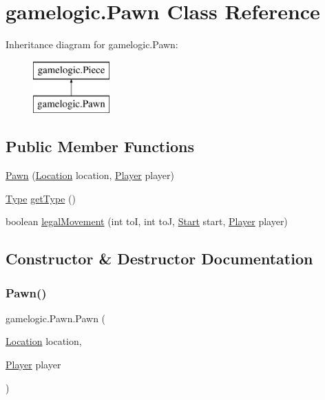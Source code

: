 \hypertarget{classgamelogic_1_1_pawn}{}\section{gamelogic.\+Pawn Class Reference}
\label{classgamelogic_1_1_pawn}
Inheritance diagram for gamelogic.\+Pawn\+:\begin{figure}[H]
\begin{center}
\leavevmode
\includegraphics[height=2.000000cm]{classgamelogic_1_1_pawn}
\end{center}
\end{figure}
\subsection*{Public Member Functions}
\begin{DoxyCompactItemize}
\item 
\mbox{\hyperlink{classgamelogic_1_1_pawn_a6ca804bf25a83fe84b36eff001737238}{Pawn}} (\mbox{\hyperlink{classgamelogic_1_1_location}{Location}} location, \mbox{\hyperlink{classgamelogic_1_1_player}{Player}} player)
\item 
\mbox{\hyperlink{enumgamelogic_1_1_type}{Type}} \mbox{\hyperlink{classgamelogic_1_1_pawn_aacb3217a868c5d3dbd98f4f96b6a7c5e}{get\+Type}} ()
\item 
boolean \mbox{\hyperlink{classgamelogic_1_1_pawn_abb8252d13a8a01c9412722543051cf37}{legal\+Movement}} (int toI, int toJ, \mbox{\hyperlink{classgamelogic_1_1_start}{Start}} start, \mbox{\hyperlink{classgamelogic_1_1_player}{Player}} player)
\end{DoxyCompactItemize}


\subsection{Constructor \& Destructor Documentation}
\mbox{\label{classgamelogic_1_1_pawn_a6ca804bf25a83fe84b36eff001737238}} 
\subsubsection{\texorpdfstring{Pawn()}{Pawn()}}
{\footnotesize\ttfamily gamelogic.\+Pawn.\+Pawn (\begin{DoxyParamCaption}\item[{\mbox{\hyperlink{classgamelogic_1_1_location}{Location}}}]{location,  }\item[{\mbox{\hyperlink{classgamelogic_1_1_player}{Player}}}]{player }\end{DoxyParamCaption})}

